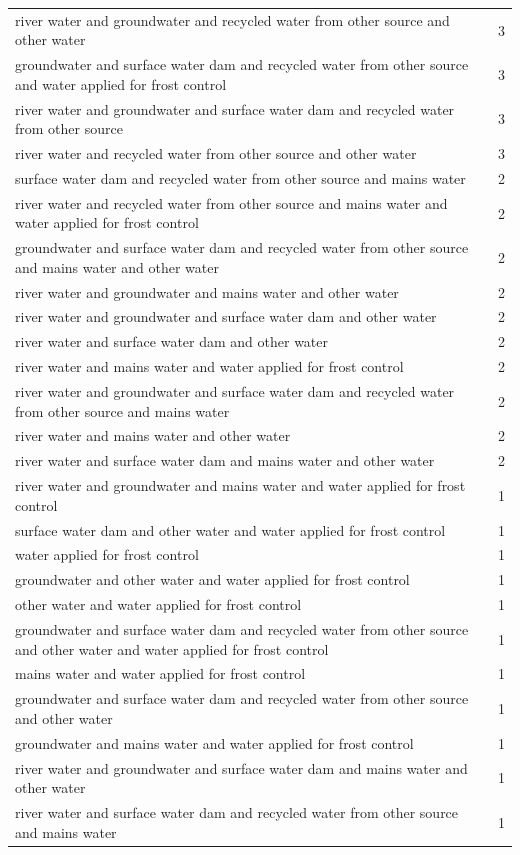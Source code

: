 \documentclass[review,12pt,authoryear]{elsarticle}
\begin{document}
\begin{linenumbers}
\begin{table}[]
\begin{tabular}{@{}ll@{}}
  river water and groundwater and recycled water from other source and other water & 3 \\
  groundwater and surface water dam and recycled water from other source and water applied for frost control & 3 \\
  river water and groundwater and surface water dam and recycled water from other source & 3 \\
  river water and recycled water from other source and other water & 3 \\
  surface water dam and recycled water from other source and mains water & 2 \\
  river water and recycled water from other source and mains water and water applied for frost control & 2 \\
  groundwater and surface water dam and recycled water from other source and mains water and other water & 2 \\
  river water and groundwater and mains water and other water & 2 \\
  river water and groundwater and surface water dam and other water & 2 \\
  river water and surface water dam and other water & 2 \\
  river water and mains water and water applied for frost control & 2 \\
  river water and groundwater and surface water dam and recycled water from other source and mains water & 2 \\
  river water and mains water and other water & 2 \\
  river water and surface water dam and mains water and other water & 2 \\
  river water and groundwater and mains water and water applied for frost control & 1 \\
  surface water dam and other water and water applied for frost control & 1 \\
  water applied for frost control & 1 \\
  groundwater and other water and water applied for frost control & 1 \\
  other water and water applied for frost control & 1 \\
  groundwater and surface water dam and recycled water from other source and other water and water applied for frost control & 1 \\
  mains water and water applied for frost control & 1 \\
  groundwater and surface water dam and recycled water from other source and other water & 1 \\
  groundwater and mains water and water applied for frost control & 1 \\
  river water and groundwater and surface water dam and mains water and other water & 1 \\
  river water and surface water dam and recycled water from other source and mains water & 1 \\ \bottomrule
  \end{tabular}
  \end{table}


\end{linenumbers}
\end{document}
